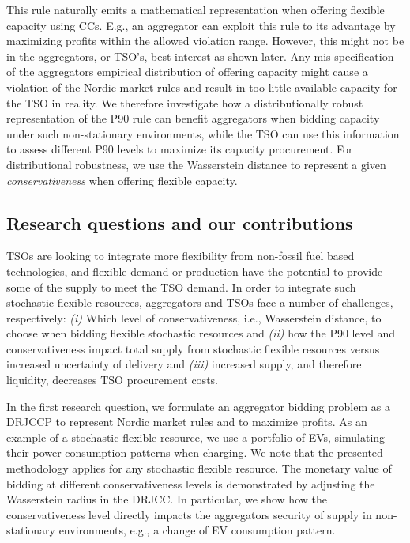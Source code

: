\documentclass[conference]{IEEEtran}
\begin{document}
This rule naturally emits a mathematical representation when offering flexible capacity using \acp{CC}. E.g., an aggregator can exploit this rule to its advantage by maximizing profits within the allowed violation range. However, this might not be in the aggregators, or \ac{TSO}'s, best interest as shown later. Any mis-specification of the aggregators empirical distribution of offering capacity might cause a violation of the Nordic market rules and result in too little available capacity for the \ac{TSO} in reality. We therefore investigate how a distributionally robust representation of the P90 rule can benefit aggregators when bidding capacity under such non-stationary environments, while the \ac{TSO} can use this information to assess different P90 levels to maximize its capacity procurement. For distributional robustness, we use the Wasserstein distance to represent a given \textit{conservativeness} when offering flexible capacity.

\subsection{Research questions and our contributions}

\acp{TSO} are looking to integrate more flexibility from non-fossil fuel based technologies, and flexible demand or production have the potential to provide some of the supply to meet the \ac{TSO} demand. In order to integrate such stochastic flexible resources, aggregators and \acp{TSO} face a number of challenges, respectively: \textit{(i)} Which level of conservativeness, i.e., Wasserstein distance, to choose when bidding flexible stochastic resources and \textit{(ii)} how the P90 level and conservativeness impact total supply from stochastic flexible resources versus increased uncertainty of delivery and \textit{(iii)} increased supply, and therefore liquidity, decreases \ac{TSO} procurement costs.

In the first research question, we formulate an aggregator bidding problem as a \ac{DRJCCP} to represent Nordic market rules and to maximize profits. As an example of a stochastic flexible resource, we use a portfolio of \acp{EV}, simulating their power consumption patterns when charging. We note that the presented methodology applies for any stochastic flexible resource. The monetary value of bidding at different conservativeness levels is demonstrated by adjusting the Wasserstein radius in the \ac{DRJCC}. In particular, we show how the conservativeness level directly impacts the aggregators security of supply in non-stationary environments, e.g., a change of \ac{EV} consumption pattern.
\end{document}
